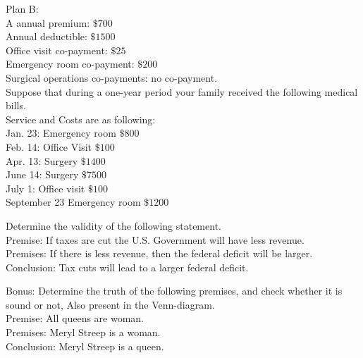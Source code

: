 \documentclass[11pt]{exam}
\begin{document}
\begin{questions}
Plan B:\\
A annual premium:   $\$700$ \\
Annual deductible:   $\$1500$ \\
Office visit  co-payment: $\$25$\\ 
Emergency room co-payment: $\$200$ \\
Surgical operations co-payments: no co-payment.\\

Suppose that during a one-year period your family received the following medical bills. \\
Service and Costs are as following: \\
Jan. 23: Emergency room $\$800$\\
Feb. 14: Office Visit $\$100$\\
Apr. 13: Surgery      $\$1400$\\
June 14: Surgery      $\$7500$\\
July 1: Office visit   $\$100$\\
September 23 Emergency room $\$1200$\\

\addpoints
\question[8] Determine the validity of the following statement. \\
Premise: If taxes are cut the U.S. Government will have less revenue. \\
Premises: If there is less revenue, then the federal deficit will be larger.\\
Conclusion: Tax cuts will lead to a larger federal deficit.\\
\vspace{10cm}

Bonus:
\question[5] Determine the truth of the following premises, and check whether it is sound or not, Also present in the Venn-diagram. \\
Premise: All queens are woman. \\
Premises: Meryl Streep is a woman.\\
Conclusion: Meryl Streep is a queen. \\
\end{questions}
\end{document}
